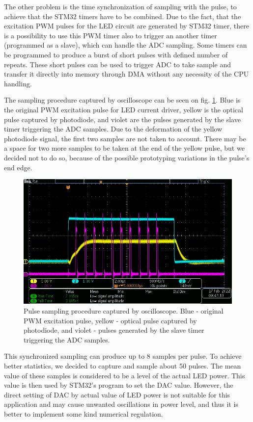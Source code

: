 \par

The other problem is the time synchronization of sampling with the pulse, to achieve that the STM32 timers have to be combined. Due to the fact, that the excitation PWM pulses for the LED circuit are generated by STM32 timer, there is a possibility to use this PWM timer also to trigger an another timer (programmed as a slave), which can handle the ADC sampling. Some timers can be programmed to produce a burst of short pulses with defined number of repeats. These short pulses can be used to trigger ADC to take sample and transfer it directly into memory through DMA without any necessity of the CPU handling.  
\par
The sampling procedure captured by oscilloscope can be seen on fig. \ref{procedure}. Blue is the original PWM excitation pulse for LED current driver, yellow is the optical pulse captured by photodiode, and violet are the pulses generated by the slave timer triggering the ADC samples. Due to the deformation of the yellow photodiode signal, the first two samples are not taken to account. 
There may be a space for two more samples to be taken at the end of the yellow pulse, but we decided not to do so, because of the possible prototyping variations in the pulse's end edge. 


\begin{figure}[H]
 \centering
 \includegraphics[scale=0.5]{./pictures/PWMSampling.png}
 \caption{Pulse sampling procedure captured by oscilloscope. Blue - original PWM excitation pulse, yellow - optical pulse captured by photodiode, and violet - pulses generated by the slave timer triggering the ADC samples.}
 \label{procedure}
\end{figure}
\par
This synchronized sampling can produce up to 8 samples per pulse. To achieve better statistics, we decided to capture and sample about 50 pulses. The mean value of these samples is considered to be a level of the actual LED power. This value is then used by STM32's program to set the DAC value. However, the direct setting of DAC by actual value of LED power is not suitable for this application and may cause unwanted oscillations in power level, and thus it is better to implement some kind numerical regulation.


